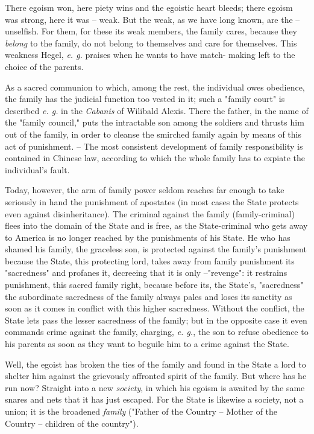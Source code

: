 \documentclass[a4paper]{book}
\begin{document}
There egoism won, here piety wins and the egoistic heart bleeds; there egoism 
was strong, here it was -- weak. But the weak, as we have long known, are the 
-- unselfish. For them, for these its weak members, the family cares, because 
they \textit{belong} to the family, do not belong to themselves and care for 
themselves. This weakness Hegel, \textit{e. g.} praises when he wants to have 
match- making left to the choice of the parents.

As a sacred communion to which, among the rest, the individual owes obedience, 
the family has the judicial function too vested in it; such a "{}family 
court"{} is described \textit{e. g.} in the \textit{Cabanis} \textit{}of 
Wilibald Alexis. There the father, in the name of the "{}family council,"{} 
puts the intractable son among the soldiers and thrusts him out of the family, 
in order to cleanse the smirched family again by means of this act of 
punishment. -- The most consistent development of family responsibility is 
contained in Chinese law, according to which the whole family has to expiate 
the individual's fault.

Today, however, the arm of family power seldom reaches far enough to take 
seriously in hand the punishment of apostates (in most cases the State 
protects even against disinheritance). The criminal against the family 
(family-criminal) flees into the domain of the State and is free, as the 
State-criminal who gets away to America is no longer reached by the 
punishments of his State. He who has shamed his family, the graceless son, is 
protected against the family's punishment because the State, this protecting 
lord, takes away from family punishment its "{}sacredness"{} and profanes it, 
decreeing that it is only --"{}revenge"{}: it restrains punishment, this 
sacred family right, because before its, the State's, "{}sacredness"{} the 
subordinate sacredness of the family always pales and loses its sanctity as 
soon as it comes in conflict with this higher sacredness. Without the 
conflict, the State lets pass the lesser sacredness of the family; but in the 
opposite case it even commands crime against the family, charging, \textit{e. 
g.}, the son to refuse obedience to his parents as soon as they want to 
beguile him to a crime against the State.

Well, the egoist has broken the ties of the family and found in the State a 
lord to shelter him against the grievously affronted spirit of the family. But 
where has he run now? Straight into a new \textit{society}, in which his 
egoism is awaited by the same snares and nets that it has just escaped. For 
the State is likewise a society, not a union; it is the broadened 
\textit{family} ("{}Father of the Country -- Mother of the Country -- children 
of the country"{}).
\end{document}
